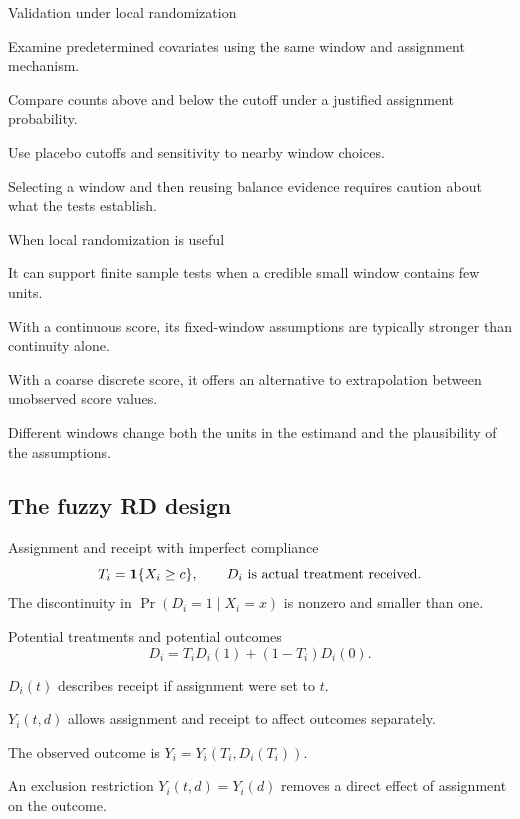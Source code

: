 \begin{frame}{Validation under local randomization}
\begin{items}
\item Examine predetermined covariates using the same window and assignment mechanism.
\item Compare counts above and below the cutoff under a justified assignment probability.
\item Use placebo cutoffs and sensitivity to nearby window choices.
\item Selecting a window and then reusing balance evidence requires caution about what the tests establish.
\end{items}
\end{frame}

\begin{frame}{When local randomization is useful}
\begin{items}
\item It can support finite sample tests when a credible small window contains few units.
\item With a continuous score, its fixed-window assumptions are typically stronger than continuity alone.
\item With a coarse discrete score, it offers an alternative to extrapolation between unobserved score values.
\item Different windows change both the units in the estimand and the plausibility of the assumptions.
\end{items}
\end{frame}

\subsection{The fuzzy RD design}
\begin{frame}{Assignment and receipt with imperfect compliance}
\[
T_i=\mathbf{1}\{X_i\geq c\},\qquad D_i\text{ is actual treatment received.}
\]
The discontinuity in $\Pr(D_i=1\mid X_i=x)$ is nonzero and smaller than one.
\end{frame}

\begin{frame}{Potential treatments and potential outcomes}
\[
D_i=T_iD_i(1)+(1-T_i)D_i(0).
\]
\begin{items}
\item $D_i(t)$ describes receipt if assignment were set to $t$.
\item $Y_i(t,d)$ allows assignment and receipt to affect outcomes separately.
\item The observed outcome is $Y_i=Y_i(T_i,D_i(T_i))$.
\item An exclusion restriction $Y_i(t,d)=Y_i(d)$ removes a direct effect of assignment on the outcome.
\end{items}
\end{frame}

